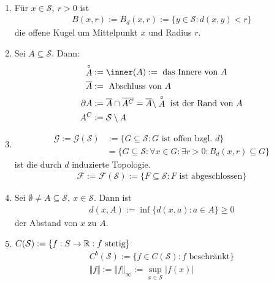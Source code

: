 \begin{definition}\
\begin{enumerate}[label={(\arabic*)}]
\item Für $x\in\mathcal{S},~r>0$ ist
\begin{align*}
B(x,r):=B_d(x,r):=\lbrace y\in\mathcal{S}:d(x,y)<r\rbrace
\end{align*}
die offene Kugel um Mittelpunkt $x$ und Radius $r$.
\item Sei $A\subseteq\mathcal{S}$. Dann:
\begin{align*}
\stackrel{\circ}{A}&:=\inner(A):=\text{ das Innere von }A\\
\overline{A}&:=\text{ Abschluss von }A\\
\partial A&:=\overline{A}\cap\overline{A^C}=\overline{A}\setminus\stackrel{\circ}{A}\text{ ist der Rand von }A\\
A^C&:=\mathcal{S}\setminus A
\end{align*}
\item \begin{align*}
\mathcal{G}:=\mathcal{G}(\mathcal{S})&:=\big\lbrace G\subseteq\mathcal{S}: G\text{ ist offen bzgl. }d\big\rbrace\\
&=\big\lbrace G\subseteq\mathcal{S}:\forall x\in G:\exists r>0:B_d(x,r)\subseteq G\big\rbrace
\end{align*}
ist die durch $d$ induzierte Topologie.
\begin{align*}
\mathcal{F}:=\mathcal{F}(\mathcal{S}):=\big\lbrace F\subseteq\mathcal{S}:F\text{ ist abgeschlossen}\big\rbrace
\end{align*}
\item Sei $\emptyset\neq A\subseteq\mathcal{S},~x\in\mathcal{S}$. Dann ist
\begin{align*}
d(x,A):=\inf\lbrace d(x,a):a\in A\rbrace\geq0
\end{align*}
der Abstand von $x$ zu $A$.
\item $C(\mathcal{S}):=\lbrace f:S\to\mathbb{R}:f\text{ stetig}\rbrace$
\begin{align*}
C^b(\mathcal{S}):=\lbrace f\in C(\mathcal{S}):f\text{ beschränkt}\rbrace\\
\Vert f\Vert:=\Vert f\Vert_\infty:=\sup\limits_{x\in\mathcal{S}}|f(x)|
\end{align*}
\end{enumerate}
\end{definition}

